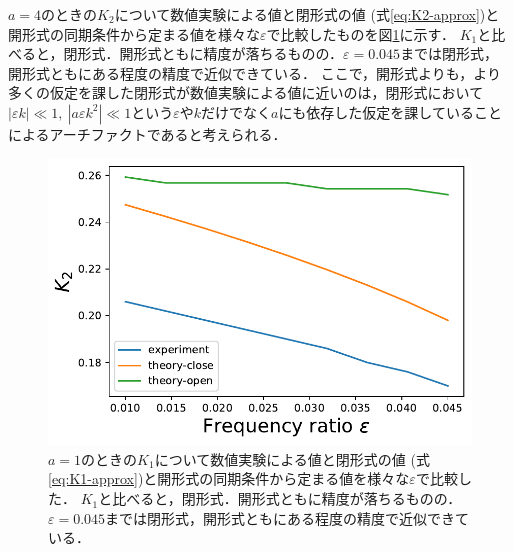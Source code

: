 \documentclass[../main]{subfiles}
\begin{document}
$a=4$のときの$K_2$について数値実験による値と閉形式の値 (式\eqref{eq:K2-approx})と開形式の同期条件から定まる値を様々な$\varepsilon$で比較したものを図\ref{fig:k2-compare}に示す．
$K_1$と比べると，閉形式．開形式ともに精度が落ちるものの．$\varepsilon=0.045$までは閉形式，開形式ともにある程度の精度で近似できている．
ここで，開形式よりも，より多くの仮定を課した閉形式が数値実験による値に近いのは，閉形式において$|\varepsilon k|\ll 1,\ |a\varepsilon k^2| \ll 1$という$\varepsilon$や$k$だけでなく$a$にも依存した仮定を課していることによるアーチファクトであると考えられる．
\begin{figure}[tbp]
\centering
\includegraphics[width=135mm]{./images/k2-compare.pdf}
\centering
\caption{$a=1$のときの$K_1$について数値実験による値と閉形式の値 (式\eqref{eq:K1-approx})と開形式の同期条件から定まる値を様々な$\varepsilon$で比較した．
$K_1$と比べると，閉形式．開形式ともに精度が落ちるものの．$\varepsilon=0.045$までは閉形式，開形式ともにある程度の精度で近似できている．}
\label{fig:k2-compare}
\end{figure}
\end{document}
